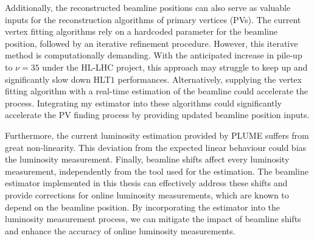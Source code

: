 Additionally, the reconstructed beamline positions can also serve as valuable inputs for the reconstruction algorithms of primary vertices (PVs). The current vertex fitting algorithms rely on a hardcoded parameter for the beamline position, followed by an iterative refinement procedure. However, this iterative method is computationally demanding. With the anticipated increase in pile-up to $\nu=35$ under the HL-LHC project, this approach may struggle to keep up and significantly slow down HLT$1$ performances. Alternatively, supplying the vertex fitting algorithm with a real-time estimation of the beamline could accelerate the process. Integrating my estimator into these algorithms could significantly accelerate the PV finding process by providing updated beamline position inputs.

Furthermore, the current luminosity estimation provided by PLUME suffers from great non-linearity. This deviation from the expected linear behaviour could bias the luminosity measurement. 
Finally, beamline shifts affect every luminosity measurement, independently from the tool used for the estimation. The beamline estimator implemented in this thesis can effectively address these shifts and provide corrections for online luminosity measurements, which are known to depend on the beamline position. By incorporating the estimator into the luminosity measurement process, we can mitigate the impact of beamline shifts and enhance the accuracy of online luminosity measurements.
